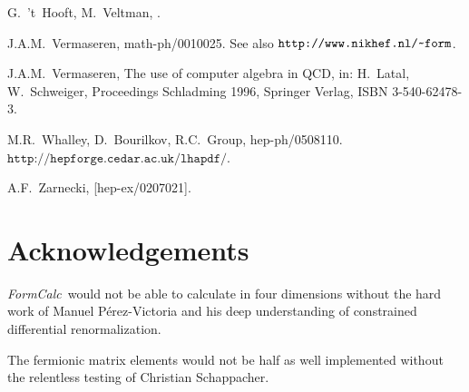 \documentclass[twoside,11pt]{article}
\def\FC{\textit{FormCalc}}
\def\Code#1{\ensuremath{\texttt{#1}}}
\def\home{\symbol{126}}
\begin{document}
\begin{flushleft}
\begin{thebibliography}{999}
G.~'t~Hooft, M.~Veltman, .

J.A.M.~Vermaseren, math-ph/0010025.
See also \Code{http://www.nikhef.nl/\home form}.

J.A.M.~Vermaseren, The use of computer algebra in QCD, in: H.~Latal, 
W.~Schweiger, Proceedings Schladming 1996, Springer Verlag, ISBN
3-540-62478-3.

M.R.~Whalley, D.~Bourilkov, R.C.~Group, hep-ph/0508110.
\Code{http://hepforge.cedar.ac.uk/lhapdf/}.

A.F.~Zarnecki,  [hep-ex/0207021].

\end{thebibliography}
\end{flushleft}

\section*{Acknowledgements}

\FC\ would not be able to calculate in four dimensions without the hard
work of Manuel P\'erez-Victoria and his deep understanding of constrained
differential renormalization.

The fermionic matrix elements would not be half as well implemented
without the relentless testing of Christian Schappacher.


\printindex
\end{document}
